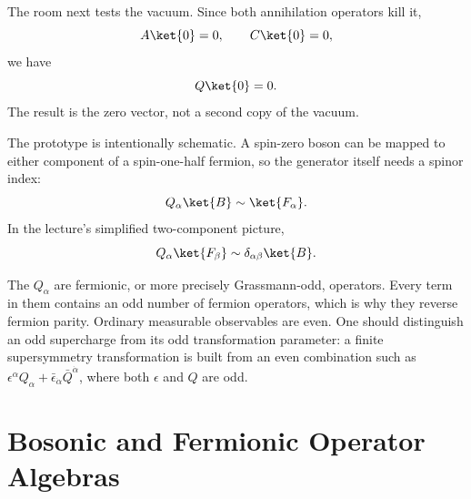 The room next tests the vacuum. Since both annihilation operators kill it,
\begin{equation}
A\ket{0}=0,\qquad C\ket{0}=0,
\end{equation}
we have
\begin{equation}
Q\ket{0}=0.
\end{equation}
The result is the zero vector, not a second copy of the vacuum.

The prototype is intentionally schematic. A spin-zero boson can be mapped to either component of a spin-one-half fermion, so the generator itself needs a spinor index:
\begin{equation}
Q_\alpha\ket{B}\sim\ket{F_\alpha}.
\end{equation}
In the lecture's simplified two-component picture,
\begin{equation}
Q_\alpha\ket{F_\beta}\sim\delta_{\alpha\beta}\ket{B}.
\end{equation}

\begin{classroomqa}
\end{classroomqa}

The \(Q_\alpha\) are fermionic, or more precisely Grassmann-odd, operators. Every term in them contains an odd number of fermion operators, which is why they reverse fermion parity. Ordinary measurable observables are even. One should distinguish an odd supercharge from its odd transformation parameter: a finite supersymmetry transformation is built from an even combination such as \(\epsilon^\alpha Q_\alpha+\bar\epsilon_{\dot\alpha}\bar Q^{\dot\alpha}\), where both \(\epsilon\) and \(Q\) are odd. 

\section{Bosonic and Fermionic Operator Algebras}

